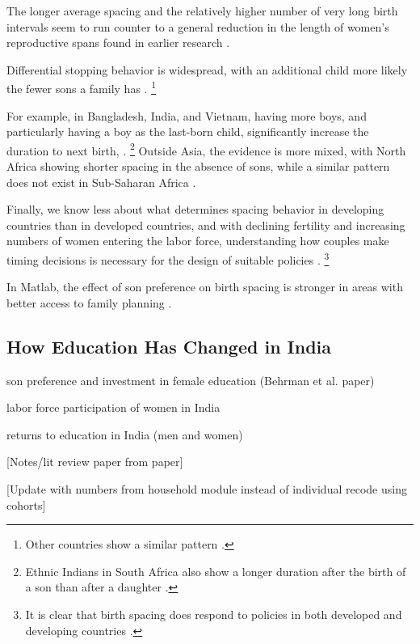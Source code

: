 The longer average spacing and the relatively higher number of very long birth intervals 
seem to run counter to a general reduction in the length of women's reproductive spans 
found in earlier research \citep{Padmadas2004}.


Differential stopping behavior is widespread, with an additional child more likely the
fewer sons a family has 
\citep{repetto72,Das1987,Arnold1997,arnold98,clark00,Basu2010,Barcellos2014}.%
\footnote{
Other countries show a similar pattern
\citep[see, for example,][]{larsen98,filmer09,Altindag2016}.
}


For example, in Bangladesh, India, and Vietnam, having more boys, and particularly having 
a boy as the last-born child, significantly increase the duration to next birth,
\citep{Haughton1995,Haughton1996,Rahman1993,Bhalotra2008,Kumar2016,Soest2018}.%
\footnote{
Ethnic Indians in South Africa also show a longer duration after the birth of a 
son than after a daughter \citep{Gangadharan2003}.
}
Outside Asia, the evidence is more mixed, with North Africa showing shorter spacing in the 
absence of sons, while a similar pattern does not exist in Sub-Saharan Africa 
\citep{Rossi2015}.


Finally, we know less about what determines spacing behavior in developing countries than 
in developed countries, and with declining fertility and increasing numbers of women 
entering the labor force, understanding how couples make timing decisions is necessary 
for the design of suitable policies \citep{Portner2018}.%
\footnote{
It is clear that birth spacing does respond to policies in both developed and 
developing countries \citep{Pettersson-Lidbom2009,Todd2012,Meckel2015,Ghosh2018}.
}


In Matlab, the effect of son preference on birth spacing is stronger in areas with better 
access to family planning \citep{Rahman1993}.


\subsection{How Education Has Changed in India}

son preference and investment in female education (Behrman et al. paper)

labor force participation of women in India

returns to education in India (men and women)

[Notes/lit review paper from paper]

[Update with numbers from household module instead of individual recode using cohorts]

